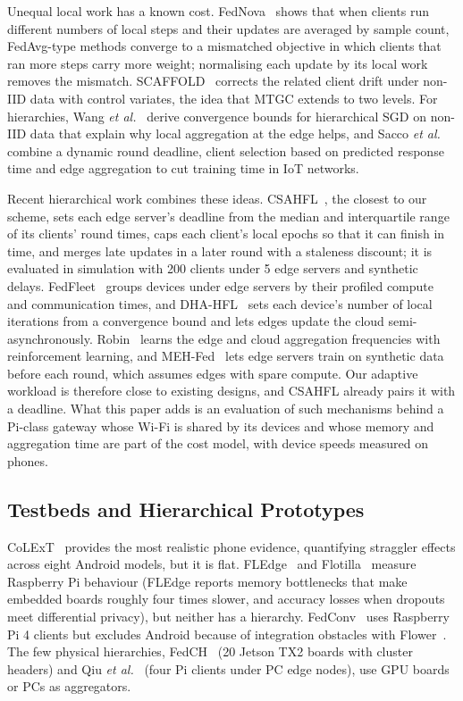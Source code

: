 \documentclass[conference]{IEEEtran}
\begin{document}
Unequal local work has a known cost. FedNova~\cite{wang2020fednova} shows that when clients run different numbers of local steps and their updates are averaged by sample count, FedAvg-type methods converge to a mismatched objective in which clients that ran more steps carry more weight; normalising each update by its local work removes the mismatch. SCAFFOLD~\cite{karimireddy2020scaffold} corrects the related client drift under non-IID data with control variates, the idea that MTGC extends to two levels. For hierarchies, Wang \textit{et al.}~\cite{wang2022demystifying} derive convergence bounds for hierarchical SGD on non-IID data that explain why local aggregation at the edge helps, and Sacco \textit{et al.}~\cite{sacco2025challenged} combine a dynamic round deadline, client selection based on predicted response time and edge aggregation to cut training time in IoT networks. 

Recent hierarchical work combines these ideas. CSAHFL~\cite{li2025csahfl}, the closest to our scheme, sets each edge server's deadline from the median and interquartile range of its clients' round times, caps each client's local epochs so that it can finish in time, and merges late updates in a later round with a staleness discount; it is evaluated in simulation with 200 clients under 5 edge servers and synthetic delays. FedFleet~\cite{xu2025fedfleet} groups devices under edge servers by their profiled compute and communication times, and DHA-HFL~\cite{he2026dhahfl} sets each device's number of local iterations from a convergence bound and lets edges update the cloud semi-asynchronously. Robin~\cite{qi2025robin} learns the edge and cloud aggregation frequencies with reinforcement learning, and MEH-Fed~\cite{wu2026mehfed} lets edge servers train on synthetic data before each round, which assumes edges with spare compute. Our adaptive workload is therefore close to existing designs, and CSAHFL already pairs it with a deadline. What this paper adds is an evaluation of such mechanisms behind a Pi-class gateway whose Wi-Fi is shared by its devices and whose memory and aggregation time are part of the cost model, with device speeds measured on phones.

\subsection{Testbeds and Hierarchical Prototypes}
CoLExT~\cite{bozic2024} provides the most realistic phone evidence, quantifying straggler effects across eight Android models, but it is flat. FLEdge~\cite{woisetschlager2024} and Flotilla~\cite{banerjee2025} measure Raspberry Pi behaviour (FLEdge reports memory bottlenecks that make embedded boards roughly four times slower, and accuracy losses when dropouts meet differential privacy), but neither has a hierarchy. FedConv~\cite{shen2024fedconv} uses Raspberry Pi 4 clients but excludes Android because of integration obstacles with Flower~\cite{beutel2020flower}. The few physical hierarchies, FedCH~\cite{wang2023fedch} (20 Jetson TX2 boards with cluster headers) and Qiu \textit{et al.}~\cite{qiu2025} (four Pi clients under PC edge nodes), use GPU boards or PCs as aggregators.
\end{document}
